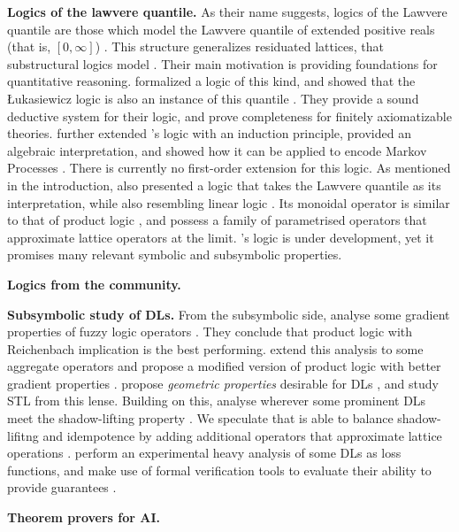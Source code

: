 
\textbf{Logics of the lawvere quantile.} As their name suggests, logics of the Lawvere quantile are those which model the Lawvere quantile of extended positive reals (that is, $[0,\infty]$)  \citep{bacci2023propositional}. This structure generalizes residuated lattices, that substructural logics model \citep{galatos2007residuated}. Their main motivation is providing foundations for quantitative reasoning. \citeauthor{bacci2023propositional} formalized a logic of this kind, and showed that the Łukasiewicz logic is also an instance of this quantile \citep{bacci2023propositional, bacci2024polynomial}. They provide a sound deductive system for their logic, and prove completeness for finitely axiomatizable theories. \citeauthor{bacci2025induction} further extended \citeauthor{bacci2024polynomial}'s logic with an induction principle, provided an algebraic interpretation, and showed how it can be applied to encode Markov Processes \citep{bacci2025induction}. There is currently no first-order extension for this logic. As mentioned in the introduction, \citeauthor{capucci2024quantifiers} also presented a logic that takes the Lawvere quantile as its interpretation, while also resembling linear logic \citep{agliano2025algebraic}. Its monoidal operator is similar to that of product logic \cite{cintula2011handbook, prooffuzzy}, and possess a family of parametrised operators that approximate lattice operators at the limit. \citeauthor{capucci2024quantifiers}'s logic is under development, yet it promises many relevant symbolic and subsymbolic properties.

\textbf{Logics from the \InAI{} community.}

\textbf{Subsymbolic study of DLs.} From the subsymbolic side, \citeauthor{van2022analyzing} analyse some gradient properties of fuzzy logic operators \cite{van2022analyzing}. They conclude that product logic with Reichenbach implication is the best performing. \citeauthor{badreddine2022logic} extend this analysis to some aggregate operators and propose a modified version of product logic with better gradient properties \citep{badreddine2022logic}. \citeauthor{varnai2020robustness} propose \emph{geometric properties} desirable for DLs \citep{varnai2020robustness}, and study STL \mcita{} from this lense. Building on this, \citeauthor{affeldt2024taming} analyse wherever some prominent DLs  meet the shadow-lifting property \citep{affeldt2024taming, varnai2020robustness}. We speculate that \citeauthor{capucci2024quantifiers} is able to balance shadow-lifitng and idempotence by adding additional operators that approximate lattice operations \citep{capucci2024quantifiers}. \citeauthor{FLINKOW2025103280} perform an experimental heavy analysis of some DLs as loss functions, and make use of formal verification tools to evaluate their ability to provide guarantees \citep{FLINKOW2025103280}. 

\textbf{Theorem provers for AI.}

\TODO
